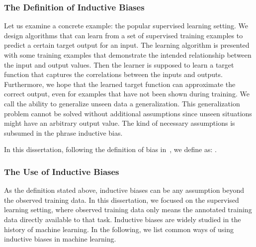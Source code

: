 \subsubsection{The Definition of Inductive Biases}
\label{sssec:intro:def-bias}
Let us examine a concrete example: the popular supervised learning
setting. We design algorithms that can learn from a set of supervised
training examples to predict a certain target output for an input. The
learning algorithm is presented with some training examples that
demonstrate the intended relationship between the input and output
values. Then the learner is supposed to learn a target function that
captures the correlations between the inputs and outputs. Furthermore,
we hope that the learned target function can approximate the correct
output, even for examples that have not been shown during training. We
call the ability to generalize unseen data a generalization. This
generalization problem cannot be solved without additional assumptions
since unseen situations might have an arbitrary output value. The kind
of necessary assumptions is subsumed in the phrase inductive bias.


In this dissertation, following the definition of bias
in~\cite{mitchell1980need}, we define  as:
.


\subsubsection{The Use of Inductive Biases}
\label{sssec:intro:use-bias}
As the definition stated above, inductive biases can be any assumption
beyond the observed training data. In this dissertation, we focused on the
supervised learning setting, where observed training data only means
the annotated training data directly available to that task. Inductive
biases are widely studied in the history of machine learning. In the
following, we list common ways of using inductive biases in
machine learning.

